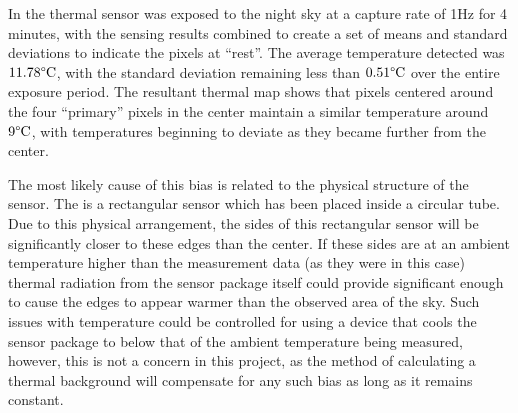\documentclass[../thesis/thesis.tex]{subfiles}
\begin{document}
In  the thermal sensor was exposed to the night sky at a capture rate of 1Hz for 4 minutes, with the sensing results combined to create a set of means and standard deviations to indicate the pixels at ``rest''. The average temperature detected was $11.78\degree\textrm{C}$, with the standard deviation remaining less than $0.51\degree\textrm{C}$ over the entire exposure period. The resultant thermal map shows that pixels centered around the four ``primary'' pixels in the center maintain a similar temperature around $9\degree\textrm{C}$, with temperatures beginning to deviate as they became further from the center.

The most likely cause of this bias is related to the physical structure of the sensor. The \mlx is a rectangular sensor which has been placed inside a circular tube. Due to this physical arrangement, the sides of this rectangular sensor will be significantly closer to these edges than the center. If these sides are at an ambient temperature higher than the measurement data (as they were in this case) thermal radiation from the sensor package itself could provide significant enough to cause the edges to appear warmer than the observed area of the sky. Such issues with temperature could be controlled for using a device that cools the sensor package to below that of the ambient temperature being measured, however, this is not a concern in this project, as the method of calculating a thermal background will compensate for any such bias as long as it remains constant.
\end{document}
